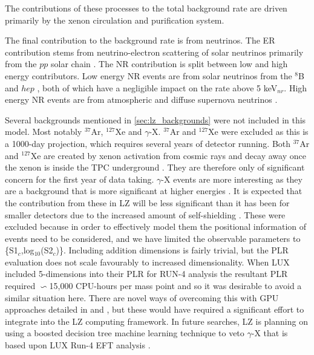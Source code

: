 The contributions of these processes to the total background rate are driven primarily by the xenon circulation and purification system. 
\par
The final contribution to the background rate is from neutrinos.
The ER contribution stems from neutrino-electron scattering of solar neutrinos primarily from the $pp$ solar chain \cite{solar_neutrinos_ref}.
The NR contribution is split between low and high energy contributors. 
Low energy NR events are from solar neutrinos from the $^{8}$B \cite{b8_neutrino_rate_ref} and $hep$ \cite{solar_neutrinos_rate_ref}, both of which have a negligible impact on the rate above 5 keV$_{nr}$.
High energy NR events are from atmospheric \cite{atmospheric_neutrinos_rate_ref} and diffuse supernova neutrinos \cite{dissuse_supernova_neutrinos_rate_ref}.
\par
Several backgrounds mentioned in \autoref{sec:lz_backgrounds} were not included in this model.
Most notably $^{37}$Ar, $^{127}$Xe and $\gamma$-X.
$^{37}$Ar and $^{127}$Xe were excluded as this is a 1000-day projection, which requires several years of detector running.
Both $^{37}$Ar and $^{127}$Xe are created by xenon activation from cosmic rays and decay away once the xenon is inside the TPC underground \cite{lz_argon37_ref, lux_xenon_activation_ref}.
They are therefore only of significant concern for the first year of data taking.
$\gamma$-X events are more interesting as they are a background that is more significant at higher energies \cite{gregrischbieter_thesis_ref}.
It is expected that the contribution from these in LZ will be less significant than it has been for smaller detectors due to the increased amount of self-shielding \cite{LZ_TechnicalDesignReview_ref}.
These were excluded because in order to effectively model them the positional information of events need to be considered, and we have limited the observable parameters to \{S1$_c$,log$_{10}$(S2$_c$)\}.
Including addition dimensions is fairly trivial, but the PLR evaluation does not scale favourably to increased dimensionality.
When LUX included 5-dimensions into their PLR for RUN-4 analysis the resultant PLR required $\backsim$15,000 CPU-hours per mass point \cite{billyboxer_thesis_ref} and so it was desirable to avoid a similar situation here.
There are novel ways of overcoming this with GPU approaches detailed in \cite{flamenest_ref} and \cite{lux_ml_plr_ref}, but these would have required a significant effort to integrate into the LZ computing framework.
In future searches, LZ is planning on using a boosted decision tree machine learning technique to veto $\gamma$-X that is based upon LUX Run-4 EFT analysis \cite{LUX_RUN4_EFT_2021}.

